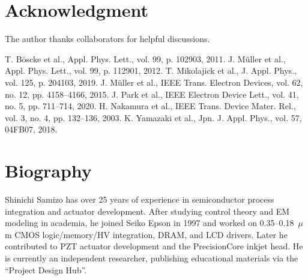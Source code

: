 \documentclass[conference]{IEEEtran}
\begin{document}
\section*{Acknowledgment}
The author thanks collaborators for helpful discussions.

\begin{thebibliography}{1}
 T. Böscke et al., Appl. Phys. Lett., vol. 99, p. 102903, 2011.
 J. Müller et al., Appl. Phys. Lett., vol. 99, p. 112901, 2012.
 T. Mikolajick et al., J. Appl. Phys., vol. 125, p. 204103, 2019.
 J. Müller et al., IEEE Trans. Electron Devices, vol. 62, no. 12, pp. 4158–4166, 2015.
 J. Park et al., IEEE Electron Device Lett., vol. 41, no. 5, pp. 711–714, 2020.
 H. Nakamura et al., IEEE Trans. Device Mater. Rel., vol. 3, no. 4, pp. 132–136, 2003.
 K. Yamazaki et al., Jpn. J. Appl. Phys., vol. 57, 04FB07, 2018.
\end{thebibliography}

\section*{Biography}
Shinichi Samizo has over 25 years of experience in semiconductor process integration and actuator development. After studying control theory and EM modeling in academia, he joined Seiko Epson in 1997 and worked on 0.35–0.18~$\mu$m CMOS logic/memory/HV integration, DRAM, and LCD drivers. Later he contributed to PZT actuator development and the PrecisionCore inkjet head. He is currently an independent researcher, publishing educational materials via the ``Project Design Hub''.
\end{document}
